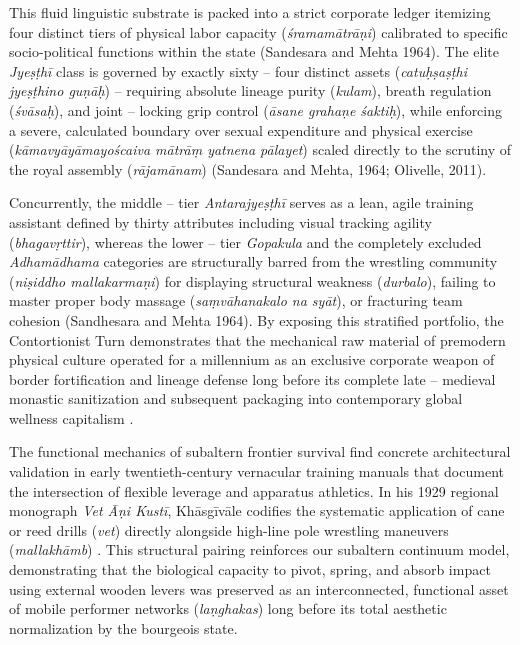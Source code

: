 \documentclass[11pt,twoside,letterpaper]{article}
\begin{document}
This fluid linguistic substrate is packed into a strict corporate ledger itemizing four distinct tiers of physical labor capacity (\textit{śramamātrāṇi}) calibrated to specific socio-political functions within the state (Sandesara and Mehta 1964). The elite \textit{Jyeṣṭhī} class is governed by exactly sixty -- four distinct assets (\textit{catuḥṣaṣṭhi jyeṣṭhino guṇāḥ}) -- requiring absolute lineage purity (\textit{kulam}), breath regulation (\textit{śvāsaḥ}), and joint -- locking grip control (\textit{āsane grahaṇe śaktiḥ}), while enforcing a severe, calculated boundary over sexual expenditure and physical exercise (\textit{kāmavyāyāmayoścaiva mātrāṃ yatnena pālayet}) scaled directly to the scrutiny of the royal assembly (\textit{rājamānam}) (Sandesara and Mehta, 1964; Olivelle, 2011).

Concurrently, the middle -- tier \textit{Antarajyeṣṭhī} serves as a lean, agile training assistant defined by thirty attributes including visual tracking agility (\textit{bhagavṛttir}), whereas the lower -- tier \textit{Gopakula} and the completely excluded \textit{Adhamādhama} categories are structurally barred from the wrestling community (\textit{niṣiddho mallakarmaṇi}) for displaying structural weakness (\textit{durbalo}), failing to master proper body massage (\textit{saṃvāhanakalo na syāt}), or fracturing team cohesion (Sandhesara and Mehta 1964). By exposing this stratified portfolio, the Contortionist Turn demonstrates that the mechanical raw material of premodern physical culture operated for a millennium as an exclusive corporate weapon of border fortification and lineage defense long before its complete late -- medieval monastic sanitization and subsequent packaging into contemporary global wellness capitalism \citep{Sandesara1964, Wujastyk2025}.

The functional mechanics of subaltern frontier survival find concrete architectural validation in early twentieth-century vernacular training manuals that document the intersection of flexible leverage and apparatus athletics. In his 1929 regional monograph \textit{Vet Āṇi Kustī}, Khāsgīvāle codifies the systematic application of cane or reed drills (\textit{vet}) directly alongside high-line pole wrestling maneuvers (\textit{mallakhāmb}) \citep{Khasgivale1929}. This structural pairing reinforces our subaltern continuum model, demonstrating that the biological capacity to pivot, spring, and absorb impact using external wooden levers was preserved as an interconnected, functional asset of mobile performer networks (\textit{laṇghakas}) long before its total aesthetic normalization by the bourgeois state.
\end{document}
